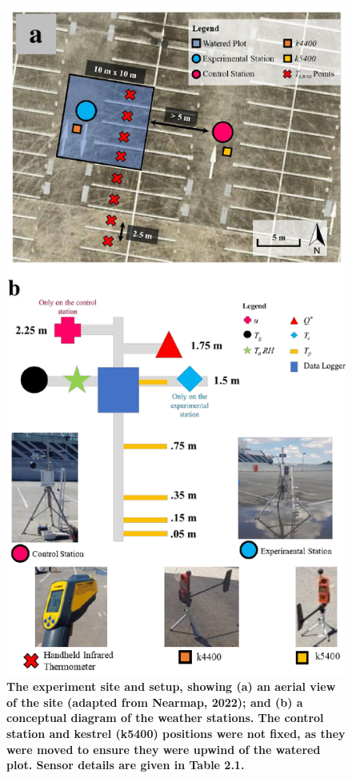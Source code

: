 \documentclass[final,3p,times,authoryear]{elsarticle}
\begin{document}
\begin{figure}
\centering
\includegraphics[trim={0 0 0 0},clip,scale=1.0]{pict001b.png}
\caption{\bf The experiment site and setup, showing (a) an aerial view of the site (adapted from Nearmap, 2022); and (b) a conceptual diagram of the weather stations. The control station and kestrel (k5400) positions were not fixed, as they were moved to ensure they were upwind of the watered plot. Sensor details are given in Table 2.1.}
 \label{fig:2.1}
\end{figure}
\end{document}
